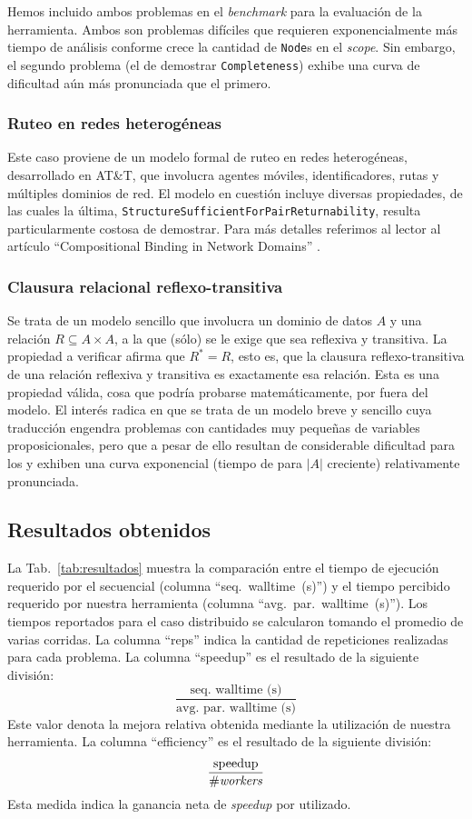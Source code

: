 Hemos incluido ambos problemas en el \emph{benchmark} para la evaluación de la herramienta. Ambos son problemas difíciles que requieren exponencialmente más tiempo de análisis conforme crece la cantidad de \texttt{Node}s en el \emph{scope}. Sin embargo, el segundo problema (el de demostrar \texttt{Completeness}) exhibe una curva de dificultad aún más pronunciada que el primero.


\subsubsection{Ruteo en redes heterogéneas}

Este caso proviene de un modelo formal de ruteo en redes heterogéneas, desarrollado en AT\&T, que involucra agentes móviles, identificadores, rutas y múltiples dominios de red. El modelo en cuestión incluye diversas propiedades, de las cuales la última, \texttt{StructureSufficientForPairReturnability}, resulta particularmente costosa de demostrar. Para más detalles referimos al lector al artículo ``Compositional Binding in Network Domains'' \cite{zave:fm06}.


\subsubsection{Clausura relacional reflexo-transitiva}

Se trata de un modelo sencillo que involucra un dominio de datos $A$ y una relación $R \subseteq A \times A$, a la que (sólo) se le exige que sea reflexiva y transitiva. La propiedad a verificar afirma que $R^{*} = R$, esto es, que la clausura reflexo-transitiva de una relación reflexiva y transitiva es exactamente esa relación. Esta es una propiedad válida, cosa que podría probarse matemáticamente, por fuera del modelo. El interés radica en que se trata de un modelo breve y sencillo cuya traducción engendra problemas con cantidades muy pequeñas de variables proposicionales, pero que a pesar de ello resultan de considerable dificultad para los \ssolvers y exhiben una curva exponencial (tiempo de \solving para $|A|$ creciente) relativamente pronunciada.


\subsection{Resultados obtenidos}


La Tab.~\ref{tab:resultados} muestra la comparación entre el tiempo de
ejecución requerido por el \ssolver secuencial (columna ``seq.~walltime~(s)'')
y el tiempo percibido requerido por nuestra herramienta (columna
``avg.~par.~walltime~(s)''). Los tiempos reportados para el caso distribuido
se calcularon tomando el promedio de varias corridas. La columna ``reps''
indica la cantidad de repeticiones realizadas para cada problema. La columna
``speedup'' es el resultado de la siguiente división:
$$\frac{\text{seq.~walltime~(s)}}{\text{avg.~par.~walltime~(s)}}$$ Este valor
denota la mejora relativa obtenida mediante la utilización de nuestra
herramienta. La columna ``efficiency'' es el resultado de la siguiente división:
$$\frac{\text{speedup}}{\text{\#\emph{workers}}}$$
Esta medida indica la ganancia neta de \emph{speedup} por \w utilizado.

